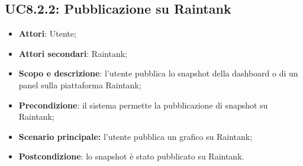 \subsection{UC8.2.2: Pubblicazione su Raintank}
\hypertarget{UC8.2.2}{}
\begin{itemize}
	\item \textbf{Attori}: Utente;
	\item \textbf{Attori secondari}: Raintank;
	\item \textbf{Scopo e descrizione}: l'utente pubblica lo snapshot della dashboard o di un panel sulla piattaforma Raintank;
	\item \textbf{Precondizione}: il sistema permette la pubblicazione di snapshot su Raintank;
	\item \textbf{Scenario principale:} l'utente pubblica un grafico su Raintank;
	\item \textbf{Postcondizione}: lo snapshot è stato pubblicato su Raintank.
\end{itemize}

